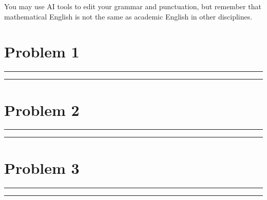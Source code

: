 \documentclass{article}
\theoremstyle{definition}
\newenvironment{solution}{\bigskip\hrule{\hfill}}{\bigskip\hrule{\hfill}} %
\begin{document}
You may use AI tools to edit your grammar and punctuation, but remember that mathematical English is not the same as academic English in other disciplines. 

\vfill

\newpage


\section*{Problem 1}

\begin{solution}


\end{solution}


\newpage


\section*{Problem 2}

\begin{solution}


\end{solution}


\newpage


\section*{Problem 3}

\begin{solution}


\end{solution}
\end{document}
